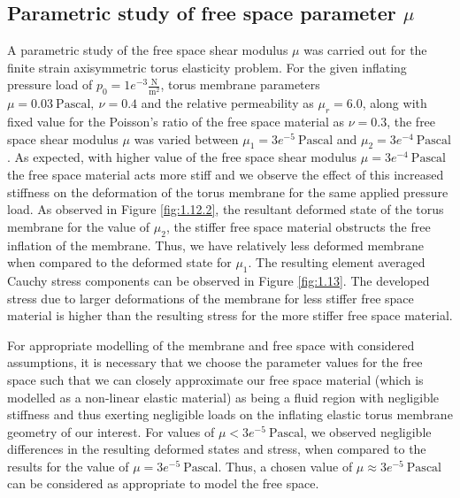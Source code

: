 \documentclass[11pt,a4paper,final]{article}
\begin{document}
\subsection{Parametric study of free space parameter $\mu$}
A parametric study of the free space shear modulus $\mu$ was carried out for the finite strain axisymmetric torus elasticity problem. For the given inflating pressure load of $p_0 = 1e^{-3} \frac{\text{N}}{\text{m}^2}$, torus membrane parameters $\mu = 0.03 \ \text{Pascal}, \ \nu = 0.4$ and the relative permeability as $\mu_r = 6.0$, along with fixed value for the Poisson's ratio of the free space material as $\nu = 0.3$, the free space shear modulus $\mu$ was varied between $\mu_1 = 3e^{-5} \ \text{Pascal}$ and $\mu_2 = 3e^{-4} \ \text{Pascal}$. As expected, with higher value of the free space shear modulus $\mu = 3e^{-4} \ \text{Pascal}$ the free space material acts more stiff and we observe the effect of this increased stiffness on the deformation of the torus membrane for the same applied pressure load. As observed in Figure \eqref{fig:1.12.2}, the resultant deformed state of the torus membrane for the value of $\mu_2$, the stiffer free space material obstructs the free inflation of the membrane. Thus, we have relatively less deformed membrane when compared to the deformed state for $\mu_1$. The resulting element averaged Cauchy stress components can be observed in Figure \eqref{fig:1.13}. The developed stress due to larger deformations of the membrane for less stiffer free space material is higher than the resulting stress for the more stiffer free space material. \par 

For appropriate modelling of the membrane and free space with considered assumptions, it is necessary that we choose the parameter values for the free space such that we can closely approximate our free space material (which is modelled as a non-linear elastic material) as being a fluid region with negligible stiffness and thus exerting negligible loads on the inflating elastic torus membrane geometry of our interest. For values of $\mu < 3e^{-5} \ \text{Pascal}$, we observed negligible differences in the resulting deformed states and stress, when compared to the results for the value of $\mu = 3e^{-5} \ \text{Pascal}$. Thus, a chosen value of $\mu \approx 3e^{-5} \ \text{Pascal}$ can be considered as appropriate to model the free space. \par 
\end{document}
